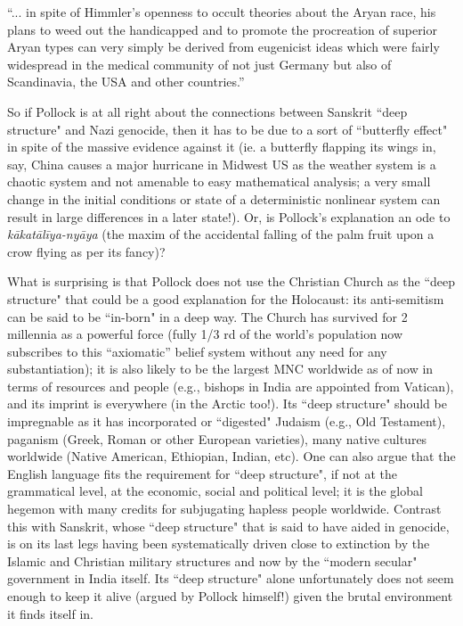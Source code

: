 \begin{myquote}
“... in spite of Himmler's openness to occult theories about the Aryan race, his plans to weed out the handicapped and to promote the procreation of superior Aryan types can very simply be derived from eugenicist ideas which were fairly widespread in the medical community of not just Germany but also of Scandinavia, the USA and other countries.”
\end{myquote}

So if Pollock is at all right about the connections between Sanskrit ``deep structure" and Nazi genocide, then it has to be due to a sort of ``butterfly effect" in spite of the massive evidence against it (ie. a butterfly flapping its wings in, say, China causes a major hurricane in Midwest US as the weather system is a chaotic system and not amenable to easy mathematical analysis; a very small change in the initial conditions or state of a deterministic nonlinear system can result in large differences in a later state!). Or, is Pollock's explanation an ode to {\sl kākatālīya-nyāya} (the maxim of the accidental falling of the palm fruit upon a crow flying as per its fancy)?

What is surprising is that Pollock does not use the Christian Church as the ``deep structure" that could be a good explanation for the Holocaust: its anti-semitism can be said to be ``in-born" in a deep way. The Church has survived for 2 millennia as a powerful force (fully 1/3 rd of the world's population now subscribes to this “axiomatic” belief system without any need for any substantiation); it is also likely to be the largest MNC worldwide as of now in terms of resources and people (e.g., bishops in India are appointed from Vatican), and its imprint is everywhere (in the Arctic too!). Its ``deep structure" should be impregnable as it has incorporated or ``digested" Judaism (e.g., Old Testament), paganism (Greek, Roman or other European varieties), many native cultures worldwide (Native American, Ethiopian, Indian, etc). One can also argue that the English language fits the requirement for ``deep structure", if not at the grammatical level, at the economic, social and political level; it is the global hegemon with many credits for subjugating hapless people worldwide. Contrast this with Sanskrit, whose “deep structure" that is said to have aided in genocide, is on its last legs having been systematically driven close to extinction by the Islamic and Christian military structures and now by the ``modern secular" government in India itself. Its ``deep structure" alone unfortunately does not seem enough to keep it alive (argued by Pollock himself!) given the brutal environment it finds itself in.

